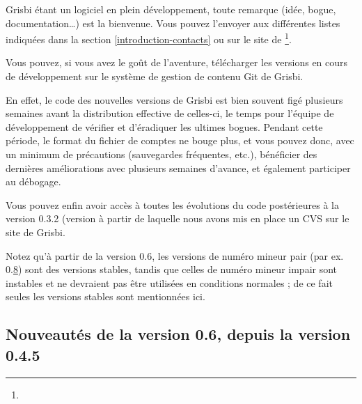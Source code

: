 Grisbi étant un logiciel en plein développement, toute remarque (idée,
bogue, documentation\dots) est la bienvenue. Vous pouvez l'envoyer aux différentes listes indiquées dans la section \vref{introduction-contacts}  ou sur le site de \footnote{\urlGrisbi{}}.

Vous pouvez, si vous avez le goût de l'aventure, télécharger les versions en 
cours de développement sur le système de gestion de contenu \gls{Git} de Grisbi.

En effet, le code des nouvelles versions de Grisbi est bien souvent figé
plusieurs semaines avant la distribution effective de celles-ci, le temps pour 
l'équipe de développement de vérifier et d'éradiquer les ultimes bogues. Pendant cette période, le format du fichier de comptes ne bouge plus, et vous pouvez donc, avec un minimum de précautions (sauvegardes fréquentes, etc.), bénéficier des dernières améliorations avec plusieurs semaines d'avance, et également participer au débogage.

Vous pouvez enfin avoir accès à toutes les évolutions du code postérieures à
la version 0.3.2 (version à partir de laquelle nous avons mis en place un \gls{CVS} sur le 
site de Grisbi.

Notez qu'à partir de la version 0.6, les versions de numéro mineur pair (par ex. 0.\underline8) sont des versions stables, tandis que celles de numéro mineur impair sont instables et ne devraient pas être utilisées en conditions normales ; de ce fait seules les versions stables sont mentionnées ici.

\newpage


\subsection{Nouveautés de la version 0.6, depuis la version 0.4.5}

